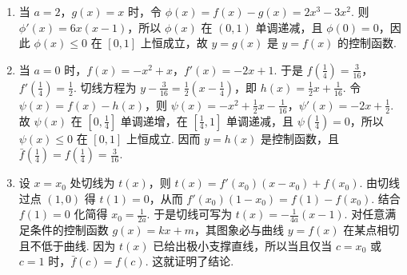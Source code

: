\begin{solution}
\begin{enumerate}
\item 当 \(a=2\)，\(g(x)=x\) 时，令 \(\phi(x)=f(x)-g(x)=2x^3-3x^2\). 则 \(\phi'(x)=6x(x-1)\)，所以 \(\phi(x)\) 在 \((0,1)\) 单调递减，且 \(\phi(0)=0\)，因此 \(\phi(x)\le 0\) 在 \([0,1]\) 上恒成立，故 \(y=g(x)\) 是 \(y=f(x)\) 的控制函数.

\item 当 \(a=0\) 时，\(f(x)=-x^2+x\)，\(f'(x)=-2x+1\). 于是 \(f\!\left(\frac14\right)=\frac{3}{16}\)，\(f'\!\left(\frac14\right)=\frac12\). 切线方程为 \(y-\frac{3}{16}=\frac12\left(x-\frac14\right)\)，即 \(h(x)=\frac12x+\frac{1}{16}\). 令 \(\psi(x)=f(x)-h(x)\)，则 \(\psi(x)=-x^2+\frac12x-\frac{1}{16}\)，\(\psi'(x)=-2x+\frac12\). 故 \(\psi(x)\) 在 \(\left[0,\frac14\right]\) 单调递增，在 \(\left[\frac14,1\right]\) 单调递减，且 \(\psi\!\left(\frac14\right)=0\)，所以 \(\psi(x)\le 0\) 在 \([0,1]\) 上恒成立. 因而 \(y=h(x)\) 是控制函数，且 \(\bar f\!\left(\frac14\right)=f\!\left(\frac14\right)=\frac{3}{16}\).

\item 设 \(x=x_0\) 处切线为 \(t(x)\)，则 \(t(x)=f'(x_0)(x-x_0)+f(x_0)\). 由切线过点 \((1,0)\) 得 \(t(1)=0\)，从而 \(f'(x_0)(1-x_0)=f(1)-f(x_0)\). 结合 \(f(1)=0\) 化简得 \(x_0=\frac{1}{2a}\). 于是切线可写为 \(t(x)=-\frac{1}{4a}(x-1)\).
对任意满足条件的控制函数 \(g(x)=kx+m\)，其图象必与曲线 \(y=f(x)\) 在某点相切且不低于曲线. 因为 \(t(x)\) 已给出极小支撑直线，所以当且仅当 \(c=x_0\) 或 \(c=1\) 时，\(\bar f(c)=f(c)\). 这就证明了结论.
\end{enumerate}
\end{solution}
